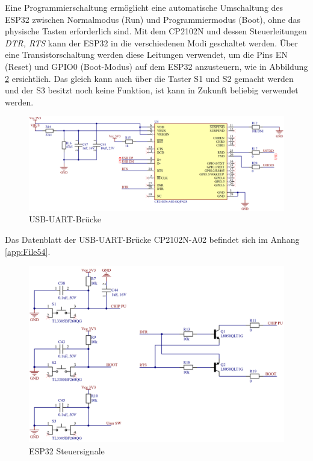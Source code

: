 Eine Programmierschaltung ermöglicht eine automatische Umschaltung des ESP32 zwischen Normalmodus (Run) und Programmiermodus (Boot), ohne das physische Tasten erforderlich sind. Mit dem CP2102N und dessen Steuerleitungen \textit{DTR, RTS} kann der ESP32 in die verschiedenen Modi geschaltet werden. Über eine Transistorschaltung werden diese Leitungen verwendet, um die Pins EN (Reset) und GPIO0 (Boot-Modus) auf dem ESP32 anzusteuern, wie in Abbildung \ref{fig:ESP32_Steuersignale} ersichtlich. Das gleich kann auch über die Taster S1 und S2 gemacht werden und der S3 besitzt noch keine Funktion, ist kann in Zukunft beliebig verwendet werden.

\begin{figure}[H]
    \centering
    \includegraphics[width=1\linewidth]{Figures/Chap3/Schematics/UART_Bridge.png}
    \caption{USB-UART-Brücke}
    \label{fig:UART_Bridge}
\end{figure}

Das Datenblatt der USB-UART-Brücke CP2102N-A02 befindet sich im Anhang \ref{app:File54}.

\begin{figure}[H]
    \centering
    \includegraphics[width=1\linewidth]{Figures/Chap3/Schematics/ESP32_Steuersignale.png}
    \caption{ESP32 Steuersignale}
    \label{fig:ESP32_Steuersignale}
\end{figure}

